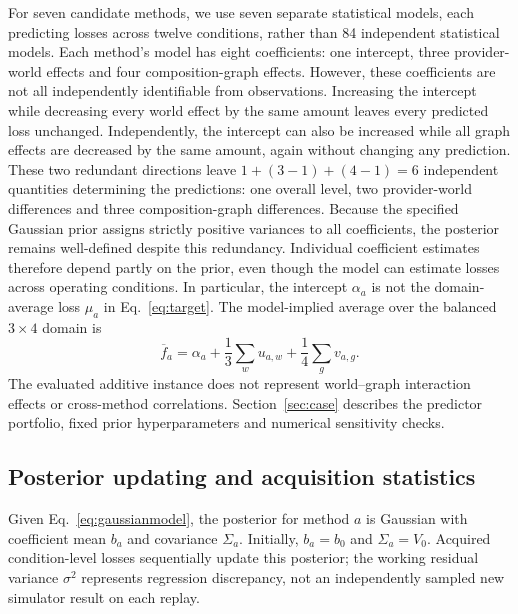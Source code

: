 \documentclass[10pt,a4paper]{article}
\begin{document}
For seven candidate methods, we use seven separate statistical models, each predicting losses across twelve conditions, rather than 84 independent statistical models. Each method's model has eight coefficients: one intercept, three provider-world effects and four composition-graph effects. However, these coefficients are not all independently identifiable from observations. Increasing the intercept while decreasing every world effect by the same amount leaves every predicted loss unchanged. Independently, the intercept can also be increased while all graph effects are decreased by the same amount, again without changing any prediction. These two redundant directions leave $1+(3-1)+(4-1)=6$ independent quantities determining the predictions: one overall level, two provider-world differences and three composition-graph differences. Because the specified Gaussian prior assigns strictly positive variances to all coefficients, the posterior remains well-defined despite this redundancy. Individual coefficient estimates therefore depend partly on the prior, even though the model can estimate losses across operating conditions. In particular, the intercept $\alpha_a$ is not the domain-average loss $\mu_a$ in Eq.~\eqref{eq:target}. The model-implied average over the balanced $3\times4$ domain is
\begin{equation}
\overline{f}_a
=\alpha_a+\frac{1}{3}\sum_w u_{a,w}
+\frac{1}{4}\sum_g v_{a,g}.
\label{eq:additive-average}
\end{equation}
The evaluated additive instance does not represent world--graph interaction effects or cross-method correlations. Section~\ref{sec:case} describes the predictor portfolio, fixed prior hyperparameters and numerical sensitivity checks.

\subsection{Posterior updating and acquisition statistics}
Given Eq.~\eqref{eq:gaussianmodel}, the posterior for method $a$ is Gaussian with coefficient mean $b_a$ and covariance $\Sigma_a$. Initially, $b_a=b_0$ and $\Sigma_a=V_0$. Acquired condition-level losses sequentially update this posterior; the working residual variance $\sigma^2$ represents regression discrepancy, not an independently sampled new simulator result on each replay.
\end{document}
